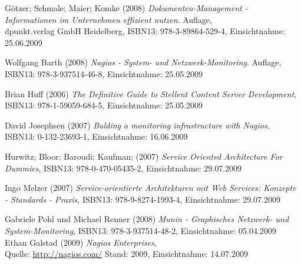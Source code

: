 \documentclass[12pt, a4paper, headsepline]{article}
\newcommand{\pictext}[1]{\glqq\textit{#1}\grqq }
\begin{document}

\begin{thebibliography}{xxxxxxxxxxx}

	 Götzer; Schmale; Maier; Komke (2008) \pictext{Dokumenten-Management - Informationen im Unternehmen effizient nutzen} 4. Auflage,\\
	 dpunkt.verlag GmbH Heidelberg,  
	 ISBN13: 978-3-89864-529-4, Einsichtnahme: 25.06.2009

	 Wolfgang Barth (2008) \pictext{Nagios - System- und Netzwerk-Monitoring} 2. Auflage, \\
	 ISBN13: 978-3-937514-46-8, Einsichtnahme: 25.05.2009
	 
	 Brian Huff (2006) \pictext{The Definitive Guide to Stellent Content Server Development}, \newline ISBN13: 978-1-59059-684-5, Einsichtnahme: 25.05.2009

	 David Josephsen (2007) \pictext{Bulding a monitoring infrastructure with Nagios}, \newline ISBN13: 0-132-23693-1, Einsichtnahme: 16.06.2009

	 Hurwitz; Bloor; Baroudi; Kaufman; (2007) \pictext{Service Oriented Architecture For Dummies}, \newline ISBN13: 978-0-470-05435-2, Einsichtnahme: 29.07.2009
	 
		 Ingo Melzer (2007) \pictext{Service-orientierte Architekturen mit Web Services: Konzepte - Standards - Praxis}, \newline ISBN13: 978-9-8274-1993-4, Einsichtnahme: 29.07.2009	 
		 
		 	  Gabriele Pohl und Michael Renner (2008) 
	 \pictext{Munin - Graphisches Netzwerk- und System-Monitoring}, \newline ISBN13: 978-3-937514-48-2, Einsichtnahme: 05.04.2009\\	
	 	
	 	 	 	  Ethan Galstad (2009) \pictext{Nagios Enterprises}, \\ Quelle: \url{http://nagios.com/} \newline Stand: 2009, Einsichtnahme: 14.07.2009
 	

\end{thebibliography}
\end{document}
